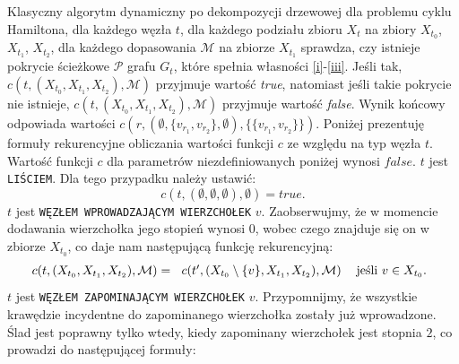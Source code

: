 \documentclass[12pt, oneside]{report}
\begin{document}
Klasyczny algorytm dynamiczny po dekompozycji drzewowej dla problemu cyklu Hamiltona, dla każdego węzła $t$, dla każdego podziału zbioru $X_t$ na zbiory $X_{t_0}$, $X_{t_1}$, $X_{t_2}$, dla każdego dopasowania $\mathcal{M}$ na zbiorze $X_{t_1}$ sprawdza, czy istnieje pokrycie ścieżkowe $\mathcal{P}$ grafu $G_t$, które spełnia własności \ref{i}-\ref{iii}. Jeśli tak, $c(t, (X_{t_0}, X_{t_1}, X_{t_2}), \mathcal{M})$ przyjmuje wartość \emph{true}, natomiast jeśli takie pokrycie nie istnieje, $c(t, (X_{t_0}, X_{t_1}, X_{t_2}), \mathcal{M})$ przyjmuje wartość \emph{false}. Wynik końcowy odpowiada wartości $c(r, (\emptyset, \{v_{r_1}, v_{r_2}\}, \emptyset), \{\{v_{r_1}, v_{r_2}\}\})$. Poniżej prezentuję formuły rekurencyjne obliczania wartości funkcji $c$ ze względu na typ węzła $t$. Wartość funkcji $c$ dla parametrów niezdefiniowanych poniżej wynosi $false$.
\newline\newline
$t$ jest \texttt{LIŚCIEM}. Dla tego przypadku należy ustawić:
$$c(t, (\emptyset, \emptyset, \emptyset), \emptyset) = true.$$
\newline
$t$ jest \texttt{WĘZŁEM WPROWADZAJĄCYM WIERZCHOŁEK} $v$. Zaobserwujmy, że w momencie dodawania wierzchołka jego stopień wynosi $0$, wobec czego znajduje się on w zbiorze $X_{t_0}$, co daje nam następującą funkcję rekurencyjną:
\[
c(t, (X_{t_0}, X_{t_1}, X_{t_2}), \mathcal{M}) =  
  \begin{tabular}{ccc}
  $c(t', (X_{t_0} \setminus \{v\}, X_{t_1}, X_{t_2}), \mathcal{M})$ & jeśli $v \in X_{t_0}$.\\
  \end{tabular}
\]
\newline
$t$ jest \texttt{WĘZŁEM ZAPOMINAJĄCYM WIERZCHOŁEK} $v$. Przypomnijmy, że wszystkie krawędzie incydentne do zapominanego wierzchołka zostały już wprowadzone. Ślad jest poprawny tylko wtedy, kiedy zapominany wierzchołek jest stopnia $2$, co prowadzi do następującej formuły:
\end{document}
